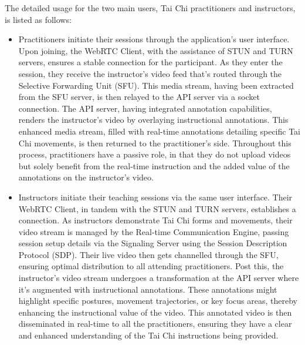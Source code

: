\documentclass[12pt]{article}
\begin{document}
The detailed usage for the two main users, Tai Chi practitioners and instructors, is listed as follows:
\begin{itemize}
    \item Practitioners initiate their sessions through the application's user interface. Upon joining, the WebRTC Client, with the assistance of STUN and TURN servers, ensures a stable connection for the participant. As they enter the session, they receive the instructor's video feed that's routed through the Selective Forwarding Unit (SFU). This media stream, having been extracted from the SFU server, is then relayed to the API server via a socket connection. The API server, having integrated annotation capabilities, renders the instructor's video by overlaying instructional annotations. This enhanced media stream, filled with real-time annotations detailing specific Tai Chi movements, is then returned to the practitioner's side. Throughout this process, practitioners have a passive role, in that they do not upload videos but solely benefit from the real-time instruction and the added value of the annotations on the instructor's video.
    \item Instructors initiate their teaching sessions via the same user interface. Their WebRTC Client, in tandem with the STUN and TURN servers, establishes a connection. As instructors demonstrate Tai Chi forms and movements, their video stream is managed by the Real-time Communication Engine, passing session setup details via the Signaling Server using the Session Description Protocol (SDP). Their live video then gets channelled through the SFU, ensuring optimal distribution to all attending practitioners. Post this, the instructor's video stream undergoes a transformation at the API server where it's augmented with instructional annotations. These annotations might highlight specific postures, movement trajectories, or key focus areas, thereby enhancing the instructional value of the video. This annotated video is then disseminated in real-time to all the practitioners, ensuring they have a clear and enhanced understanding of the Tai Chi instructions being provided.
\end{itemize}
\end{document}

